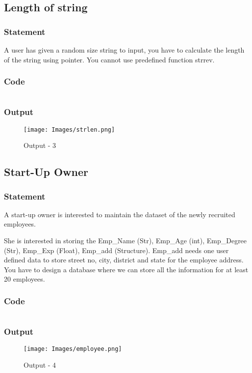 \pagebreak
\subsection{Length of string}

\subsubsection{Statement}
A user has given a random size string to input, you have to calculate the length of the
string using pointer. You cannot use predefined function strrev.

\subsubsection{Code}
\inputminted[]{c}{./code/strlen.cpp}
\subsubsection{Output}
\begin{figure}[!htb]
  \centering
  \texttt{[image: Images/strlen.png]}
  \label{Output-3}
  \caption{Output - 3}
\end{figure}

\pagebreak
\subsection{Start-Up Owner}

\subsubsection{Statement}
A start-up owner is interested to maintain the dataset of the newly recruited employees.

She is interested in storing the Emp\_Name (Str), Emp\_Age (int), Emp\_Degree (Str), Emp\_Exp
(Float), Emp\_add (Structure). Emp\_add needs one user defined data to store street no, city,
district and state for the employee address. You have to design a database where we can store all
the information for at least 20 employees.

\subsubsection{Code}
\inputminted[]{c}{./code/employee.cpp}
\pagebreak
\subsubsection{Output}
\begin{figure}[!htb]
  \centering
  \texttt{[image: Images/employee.png]}
  \label{Output-4}
  \caption{Output - 4}
\end{figure}


